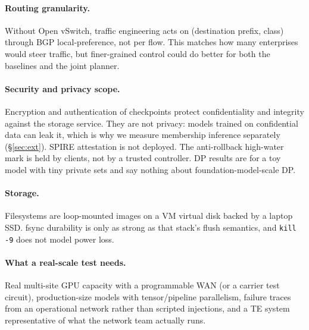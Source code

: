 \paragraph{Routing granularity.}
Without Open vSwitch, traffic engineering acts on (destination prefix, class) through BGP
local-preference, not per flow. This matches how many enterprises would steer traffic, but finer-grained
control could do better for both the baselines and the joint planner.

\paragraph{Security and privacy scope.}
Encryption and authentication of checkpoints protect confidentiality and integrity against the storage
service. They are not privacy: models trained on confidential data can leak it, which is why we
measure membership inference separately (\S\ref{sec:ext}). SPIRE attestation is not deployed. The
anti-rollback high-water mark is held by clients, not by a trusted controller. DP results are for a toy
model with tiny private sets and say nothing about foundation-model-scale DP.

\paragraph{Storage.}
Filesystems are loop-mounted images on a VM virtual disk backed by a laptop SSD. fsync durability is only
as strong as that stack's flush semantics, and \texttt{kill -9} does not model power loss.

\paragraph{What a real-scale test needs.}
Real multi-site GPU capacity with a programmable WAN (or a carrier test circuit), production-size
models with tensor/pipeline parallelism, failure traces from an operational network rather than scripted
injections, and a TE system representative of what the network team actually runs.
